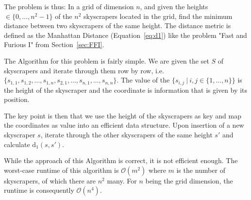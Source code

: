 \documentclass[a4paper,12pt,headsepline]{scrartcl}
\begin{document}
    The problem is thus: In a grid of dimension $n$, and given the heights $\in \{0,\ldots,n^2-1\}$ of the $n^2$ skyscrapers located in the grid, find the minimum distance between two skyscrapers of the same height.
    The distance metric is defined as the Manhattan Distance (Equation~\ref{eq:d1}) like the problem "Fast and Furious \textrm{I}" from Section~\ref{sec:FFI}.

    The Algorithm for this problem is fairly simple.
    We are given the set $S$ of skyscrapers and iterate through them row by row, i.e.\ $\{s_{1,1}, s_{1,2},\ldots,s_{1,n},s_{2,1},\ldots,s_{n,1},\ldots,s_{n,n}\}$.
    The value of the $\{s_{i,j} \ \vert \ i,j \in \{1,\ldots,n\}\}$ is the height of the skyscraper and the coordinate is information that is given by its position.
    
    The key point is then that we use the height of the skyscrapers as key and map the coordinates as value into an efficient data structure. %
    Upon insertion of a new skyscraper $s$, iterate through the other skyscrapers of the same height $s'$ and calculate $\operatorname{d_1}(s,s').$%

            
                
                
    While the approach of this Algorithm is correct, it is not efficient enough.
    The worst-case runtime of this algorithm is $\mathcal{O}(m^2)$ where $m$ is the number of skyscrapers, of which there are $n^2$ many.
    For $n$ being the grid dimension, the runtime is consequently $\mathcal{O}(n^4)$.
    
\end{document}
